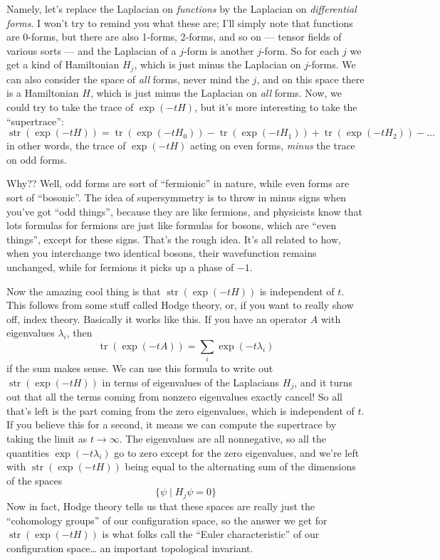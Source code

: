 \documentclass{article}
\begin{document}
Namely, let's replace the Laplacian on \emph{functions} by the Laplacian
on \emph{differential forms}. I won't try to remind you what these are;
I'll simply note that functions are 0-forms, but there are also 1-forms,
2-forms, and so on --- tensor fields of various sorts --- and the
Laplacian of a \(j\)-form is another \(j\)-form. So for each \(j\) we
get a kind of Hamiltonian \(H_j\), which is just minus the Laplacian on
\(j\)-forms. We can also consider the space of \emph{all} forms, never
mind the \(j\), and on this space there is a Hamiltonian \(H\), which is
just minus the Laplacian on \emph{all} forms. Now, we could try to take
the trace of \(\exp(-tH)\), but it's more interesting to take the
``supertrace'':
\[\operatorname{str}(\exp(-tH)) = \operatorname{tr}(\exp(-tH_0)) - \operatorname{tr}(\exp(-tH_1)) + \operatorname{tr}(\exp(-tH_2)) - \ldots\]
in other words, the trace of \(\exp(-tH)\) acting on even forms,
\emph{minus} the trace on odd forms.

Why?? Well, odd forms are sort of ``fermionic'' in nature, while even
forms are sort of ``bosonic''. The idea of supersymmetry is to throw in
minus signs when you've got ``odd things'', because they are like
fermions, and physicists know that lots formulas for fermions are just
like formulas for bosons, which are ``even things'', except for these
signs. That's the rough idea. It's all related to how, when you
interchange two identical bosons, their wavefunction remains unchanged,
while for fermions it picks up a phase of \(-1\).

Now the amazing cool thing is that \(\operatorname{str}(\exp(-tH))\) is
independent of \(t\). This follows from some stuff called Hodge theory,
or, if you want to really show off, index theory. Basically it works
like this. If you have an operator \(A\) with eigenvalues \(\lambda_i\),
then \[\operatorname{tr}(\exp(-tA)) = \sum_i \exp(-t \lambda_i)\] if the
sum makes sense. We can use this formula to write out
\(\operatorname{str}(\exp(-tH))\) in terms of eigenvalues of the
Laplacians \(H_j\), and it turns out that all the terms coming from
nonzero eigenvalues exactly cancel! So all that's left is the part
coming from the zero eigenvalues, which is independent of \(t\). If you
believe this for a second, it means we can compute the supertrace by
taking the limit as \(t\to\infty\). The eigenvalues are all nonnegative,
so all the quantities \(\exp(-t \lambda_i)\) go to zero except for the
zero eigenvalues, and we're left with \(\operatorname{str}(\exp(-tH))\)
being equal to the alternating sum of the dimensions of the spaces
\[\{\psi \mid H_j \psi = 0\}\] Now in fact, Hodge theory tells us that
these spaces are really just the ``cohomology groups'' of our
configuration space, so the answer we get for
\(\operatorname{str}(\exp(-tH))\) is what folks call the ``Euler
characteristic'' of our configuration space\ldots{} an important
topological invariant.
\end{document}
